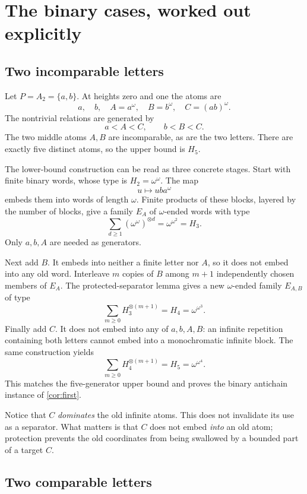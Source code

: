 \documentclass[11pt,letterpaper]{article}
\theoremstyle{definition}
\theoremstyle{remark}
\begin{document}
\section{The binary cases, worked out explicitly}\label{sec:binary}

\subsection{Two incomparable letters}

Let $P=A_2=\{a,b\}$. At heights zero and one the atoms are
\[
  a,\quad b,\quad A=a^\omega,\quad B=b^\omega,\quad C=(ab)^\omega.
\]
The nontrivial relations are generated by
\[
  a<A<C,\qquad b<B<C.
\]
The two middle atoms $A,B$ are incomparable, as are the two letters.
There are exactly five distinct atoms, so the upper bound is $H_5$.

The lower-bound construction can be read as three concrete stages.
Start with finite binary words, whose type is $H_2=\omega^\omega$.
The map
\[
  u\longmapsto u b a^\omega
\]
embeds them into words of length $\omega$. Finite products of these blocks,
layered by the number of blocks, give a family $E_A$ of $\omega$-ended
words with type
\[
  \sum_{d\ge1}(\omega^\omega)^{\otimes d}
  =\omega^{\omega^2}=H_3.
\]
Only $a,b,A$ are needed as generators.

Next add $B$. It embeds into neither a finite letter nor $A$, so it does
not embed into any old word. Interleave $m$ copies of $B$ among $m+1$
independently chosen members of $E_A$. The protected-separator lemma gives
a new $\omega$-ended family $E_{A,B}$ of type
\[
  \sum_{m\ge0}H_3^{\otimes(m+1)}=H_4=\omega^{\omega^3}.
\]
Finally add $C$. It does not embed into any of $a,b,A,B$: an infinite
repetition containing both letters cannot embed into a monochromatic
infinite block. The same construction yields
\[
  \sum_{m\ge0}H_4^{\otimes(m+1)}=H_5=\omega^{\omega^4}.
\]
This matches the five-generator upper bound and proves the binary
antichain instance of \cref{cor:first}.

Notice that $C$ \emph{dominates} the old infinite atoms. This does not
invalidate its use as a separator. What matters is that $C$ does not
embed \emph{into} an old atom; protection prevents the old coordinates
from being swallowed by a bounded part of a target $C$.

\subsection{Two comparable letters}
\end{document}
